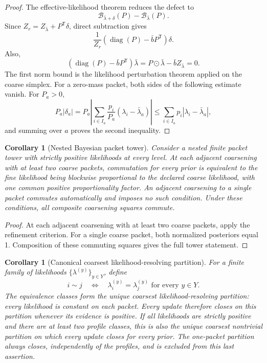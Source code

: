 \documentclass[11pt]{article}
\newtheorem{corollary}[theorem]{Corollary}
\theoremstyle{definition}
\theoremstyle{remark}
\newcommand{\cB}{\mathcal B}
\newcommand{\diag}{\operatorname{diag}}
\begin{document}
\begin{proof}
The effective-likelihood theorem reduces the defect to
\[
\cB_{\bar\lambda+\delta}(P)-\cB_{\bar\lambda}(P).
\]
Since $Z_r=Z_{\bar\lambda}+P^{\mathsf T}\delta$, direct subtraction gives
\[
\frac{1}{Z_r}
\left(\diag(P)-\bar bP^{\mathsf T}\right)\delta.
\]
Also,
\[
\left(\diag(P)-\bar bP^{\mathsf T}\right)\bar\lambda
=P\odot\bar\lambda-\bar bZ_{\bar\lambda}=0.
\]
The first norm bound is the likelihood perturbation theorem applied on the coarse simplex. For a zero-mass packet, both sides of the following estimate vanish. For $P_a>0$,
\[
P_a|\delta_a|
=
P_a\left|\sum_{i\in I_a}\frac{p_i}{P_a}
(\lambda_i-\bar\lambda_a)\right|
\le
\sum_{i\in I_a}p_i|\lambda_i-\bar\lambda_a|,
\]
and summing over $a$ proves the second inequality.
\end{proof}

\begin{corollary}[Nested Bayesian packet tower]
Consider a nested finite packet tower with strictly positive likelihoods at every level. At each adjacent coarsening with at least two coarse packets, commutation for every prior is equivalent to the fine likelihood being blockwise proportional to the declared coarse likelihood, with one common positive proportionality factor. An adjacent coarsening to a single packet commutes automatically and imposes no such condition. Under these conditions, all composite coarsening squares commute.
\end{corollary}

\begin{proof}
At each adjacent coarsening with at least two coarse packets, apply the refinement criterion. For a single coarse packet, both normalized posteriors equal 1. Composition of these commuting squares gives the full tower statement.
\end{proof}

\begin{corollary}[Canonical coarsest likelihood-resolving partition]
For a finite family of likelihoods $\{\lambda^{(y)}\}_{y\in Y}$, define
\[
i\sim j
\quad\Longleftrightarrow\quad
\lambda_i^{(y)}=\lambda_j^{(y)}
\text{ for every }y\in Y.
\]
The equivalence classes form the unique coarsest likelihood-resolving partition: every likelihood is constant on each packet. Every update therefore closes on this partition whenever its evidence is positive. If all likelihoods are strictly positive and there are at least two profile classes, this is also the unique coarsest nontrivial partition on which every update closes for every prior. The one-packet partition always closes, independently of the profiles, and is excluded from this last assertion.
\end{corollary}
\end{document}
